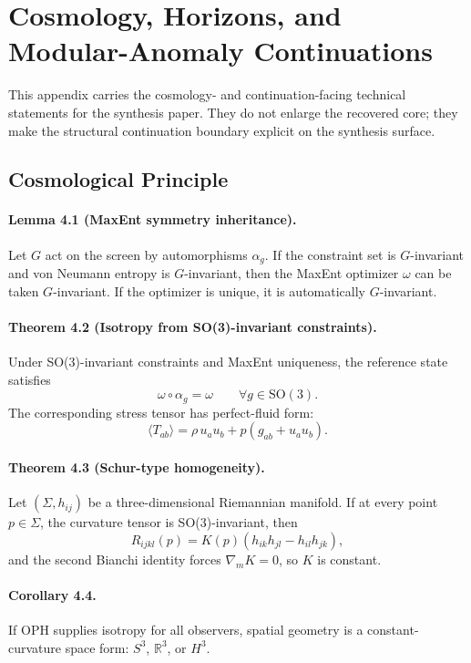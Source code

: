 \section{Cosmology, Horizons, and Modular-Anomaly Continuations}
\label{app:observers-cosmology-port}

This appendix carries the cosmology- and continuation-facing technical statements for the
synthesis paper. They do not enlarge the recovered core; they make the structural continuation
boundary explicit on the synthesis surface.

\subsection{Cosmological Principle}

\paragraph{\textbf{Lemma 4.1 (MaxEnt symmetry inheritance).}}
Let \(G\) act on the screen by automorphisms \(\alpha_g\). If the constraint set is
\(G\)-invariant and von Neumann entropy is \(G\)-invariant, then the MaxEnt optimizer \(\omega\)
can be taken \(G\)-invariant. If the optimizer is unique, it is automatically \(G\)-invariant.

\paragraph{\textbf{Theorem 4.2 (Isotropy from SO(3)-invariant constraints).}}
Under SO(3)-invariant constraints and MaxEnt uniqueness, the reference state satisfies
\[
\omega\circ\alpha_g=\omega
\qquad
\forall g\in \mathrm{SO}(3).
\]
The corresponding stress tensor has perfect-fluid form:
\[
\langle T_{ab}\rangle=\rho\,u_au_b+p(g_{ab}+u_au_b).
\]

\paragraph{\textbf{Theorem 4.3 (Schur-type homogeneity).}}
Let \((\Sigma,h_{ij})\) be a three-dimensional Riemannian manifold. If at every point
\(p\in\Sigma\), the curvature tensor is SO(3)-invariant, then
\[
R_{ijkl}(p)=K(p)(h_{ik}h_{jl}-h_{il}h_{jk}),
\]
and the second Bianchi identity forces \(\nabla_m K=0\), so \(K\) is constant.

\paragraph{\textbf{Corollary 4.4.}}
If OPH supplies isotropy for all observers, spatial geometry is a constant-curvature space form:
\(S^3\), \(\mathbb R^3\), or \(H^3\).

